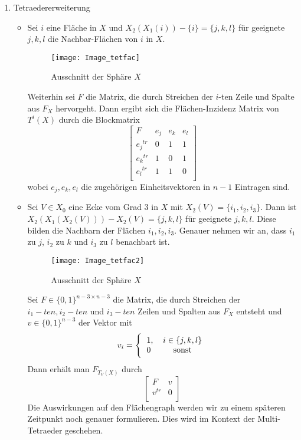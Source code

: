 \documentclass[12pt,titlepage,twoside,cleardoublepage]{article}
\theoremstyle{nummermitklammern}
\numberwithin{equation}{section}
\begin{document}
\begin{enumerate}
\item Tetraedererweiterung
\begin{itemize}  
\item Sei $i$ eine Fläche in $X$ und $X_2(X_1(i))-\{i\}=\{j,k,l\}$ für geeignete $j,k,l$ die Nachbar-Flächen von $i$ in $X.$ 
\begin{figure}[H]
\begin{center}
\texttt{[image: Image\_tetfac]}
\end{center}
\caption{Ausschnitt der Sphäre $X$}
\end{figure}
Weiterhin sei $F$ die Matrix, die durch Streichen der $i$-ten Zeile und Spalte aus $F_X$ hervorgeht. Dann ergibt sich die Flächen-Inzidenz Matrix von $T^i(X)$ durch die Blockmatrix
\[
\left[ 
\begin{array}{c|ccc} 
  F & e_j& e_k &e_l \\ 
  \hline 
  {e_j}^{tr} & 0 & 1 & 1  \\
  {e_k}^{tr} & 1 & 0 & 1 \\
  {e_l}^{tr} & 1 & 1 & 0 \\
\end{array} 
\right]
\]
wobei $e_j,e_k,e_l$ die zugehörigen Einheitsvektoren in $n-1$ Eintragen sind. 
\item Sei $V\in X_0$ eine Ecke vom Grad 3 in $X$ mit $X_2(V)=\{i_1,i_2,i_3\}.$ Dann ist $X_2(X_1(X_2(V)))-X_2(V)=\{j,k,l\}$ für geeignete $j,k,l$. Diese bilden die Nachbarn der Flächen $i_1,i_2,i_3.$ Genauer nehmen wir an, dass $i_1$ zu $j$, $i_2$ zu $k$ und $i_3$ zu $l$ benachbart ist.
\begin{figure}[H]
\begin{center}
\texttt{[image: Image\_tetfac2]}
\end{center}
\caption{Ausschnitt der Sphäre $X$}
\end{figure}  
Sei $F\in \{0,1\}^{n-3\times n-3}$ die Matrix, die durch Streichen der $i_1-ten,i_2-ten$ und $i_3-ten$ Zeilen und Spalten  aus $F_X$ entsteht und $v\in \{0,1\}^{n-3}$ der Vektor mit
\[
v_{i}=
\Biggl{\{\begin{tabular}[l]{lcr}
1,&\textcolor{black}{$i\in \{j,k,l\}$} \\
0& sonst\\
\end{tabular}}
\] Dann erhält man $F_{T_V(X)}$ durch 
\[
\left[ 
\begin{array}{c|ccc} 
  F & v \\ 
  \hline 
  {v}^{tr} & 0\\
\end{array} 
\right]
\]
Die Auswirkungen auf den Flächengraph werden wir zu einem späteren Zeitpunkt noch genauer formulieren. Dies wird im Kontext der Multi-Tetraeder geschehen.
\end{itemize}
\end{enumerate}
\end{document}
